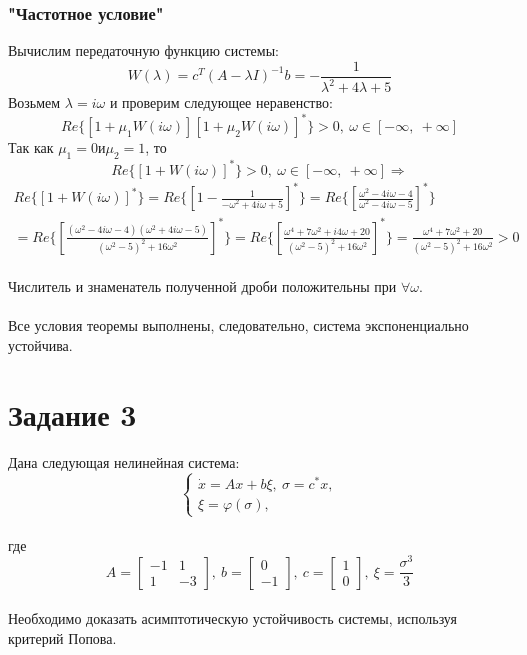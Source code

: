 \documentclass[12pt]{article}
\begin{document}
\subsubsection*{"Частотное условие"}
Вычислим передаточную функцию системы:
\[
W(\lambda) = c^T(A-\lambda I)^{-1}b = -\frac{1}{\lambda^2 + 4 \lambda + 5}
\]
Возьмем $\lambda = i \omega$ и проверим следующее неравенство:
\[
Re\{[1 + \mu_1 W(i \omega)][1 + \mu_2 W(i \omega)]^*\} > 0, \ \omega \in [-\infty, \ +\infty]
\]
Так как $\mu_1 = 0 и \mu_2 = 1$, то 
\[
Re\{[1 + W(i \omega)]^*\} > 0, \ \omega \in [-\infty, \ +\infty] \Rightarrow
\]
\[
\begin{split}
Re\{[1 + W(i \omega)]^*\} = Re\{[1 - \frac{1}{-\omega^2 + 4 i \omega + 5}]^*\} = Re\{[\frac{\omega^2 - 4 i \omega - 4}{\omega^2 - 4 i \omega - 5}]^*\} \\
= Re\{[\frac{(\omega^2 - 4 i \omega - 4)(\omega^2 + 4 i \omega - 5)}{(\omega^2 - 5)^2 + 16 \omega^2}]^*\} = Re\{[\frac{\omega^4 + 7\omega^2+i4\omega+20}{(\omega^2 - 5)^2 + 16 \omega^2}]^*\} = \frac{\omega^4 + 7\omega^2+20}{(\omega^2 - 5)^2 + 16 \omega^2} > 0
\end{split}
\]\\
Числитель и знаменатель полученной дроби положительны при $\forall \omega$. \\
\ \\
Все условия теоремы выполнены, следовательно, система экспоненциально устойчива.
\section*{Задание 3}

Дана следующая нелинейная система:
\[
\begin{cases}
    \dot{x} = Ax + b\xi, \ \sigma=c^*x,\\
    \xi = \varphi(\sigma),
\end{cases}
\]\\ где
\[
A = \begin{bmatrix}
-1 & 1\\
1 & -3
\end{bmatrix}, \ b = \begin{bmatrix}
0\\
-1
\end{bmatrix}, \ c = \begin{bmatrix}
1\\
0
\end{bmatrix}, \ \xi = \frac{\sigma^3}{3}
\]\\
Необходимо доказать асимптотическую устойчивость системы, используя критерий Попова.\\
\end{document}
